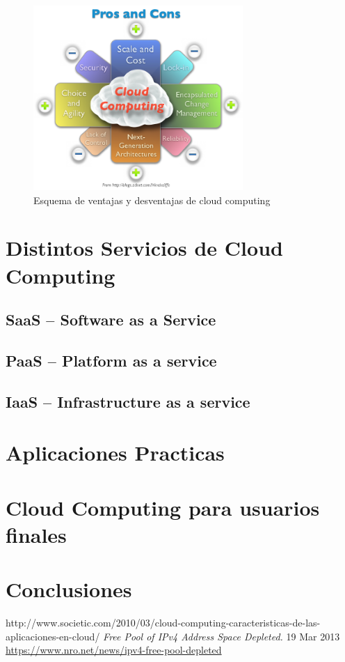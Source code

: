 \documentclass[12pt,a4paper]{article}
\begin{document}
\begin{figure}[h!]
 \centering
 \includegraphics[width=0.71\textwidth]{cc_pros.png}
\caption[pros cloud computing]{Esquema de ventajas y desventajas de cloud computing}
\end{figure}\par


\section{Distintos Servicios de Cloud Computing}
\subsection{SaaS -- Software as a Service}
\subsection{PaaS -- Platform as a service}
\subsection{IaaS -- Infrastructure as a service}

\section{Aplicaciones Practicas}

\section{Cloud Computing para usuarios finales}

\section{Conclusiones}

\newpage

\begin{thebibliography}{1}
		

http://www.societic.com/2010/03/cloud-computing-caracteristicas-de-las-aplicaciones-en-cloud/
 \emph{Free Pool of IPv4 Address Space Depleted.} 
 19 Mar 2013\\
	\url{https://www.nro.net/news/ipv4-free-pool-depleted}	


\end{thebibliography}
\end{document}
